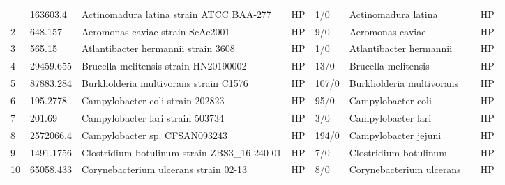 \begin{longtable}{llllllll}
\bottomrule
\endlastfoot
1   &      163603.4 &                                  Actinomadura latina strain ATCC BAA-277 &    HP &       1/0 &                            Actinomadura latina &                                 \cite{trujillo1997polyphasic} &    HP \\
2   &       648.157 &                                         Aeromonas caviae strain ScAc2001 &    HP &       9/0 &                               Aeromonas caviae &                                             \cite{tang2020co} &    HP \\
3   &        565.15 &                                      Atlantibacter hermannii strain 3608 &    HP &       1/0 &                        Atlantibacter hermannii &                                 \cite{ioannou2019escherichia} &    HP \\
4   &     29459.655 &                                    Brucella melitensis strain HN20190002 &    HP &      13/0 &                            Brucella melitensis &                                        \cite{li2020molecular} &    HP \\
5   &     87883.284 &                                    Burkholderia multivorans strain C1576 &    HP &     107/0 &                       Burkholderia multivorans &                                          \cite{silva2016long} &    HP \\
6   &      195.2778 &                                         Campylobacter coli strain 202823 &    HP &      95/0 &                             Campylobacter coli &                         \cite{sheppard2015evolution,195.2778} &    HP \\
7   &        201.69 &                                         Campylobacter lari strain 503734 &    HP &       3/0 &                             Campylobacter lari &                                \cite{igwaran2019human,201.69} &    HP \\
8   &     2572066.4 &                                            Campylobacter sp. CFSAN093243 &    HP &     194/0 &                           Campylobacter jejuni &            \cite{igwaran2019human,2572066.4,bravo2021genomic} &    HP \\
9   &     1491.1756 &                             Clostridium botulinum strain ZBS3\_16-240-01 &    HP &       7/0 &                          Clostridium botulinum &                                         \cite{peck2016impact} &    HP \\
10  &     65058.433 &                                    Corynebacterium ulcerans strain 02-13 &    HP &       8/0 &                       Corynebacterium ulcerans &                                     \cite{schaeffer2020draft} &    HP \\

\end{longtable}
